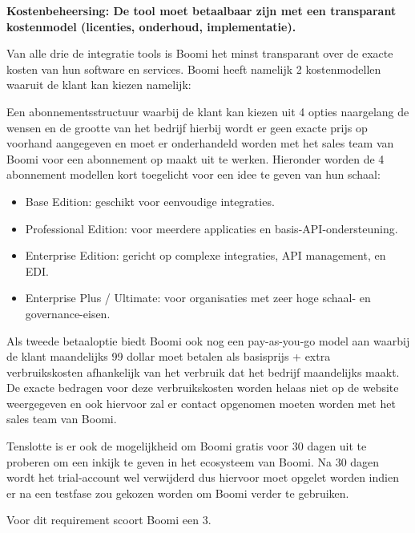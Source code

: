 \textbf{Kostenbeheersing: De tool moet betaalbaar zijn met een transparant kostenmodel (licenties, onderhoud, implementatie).}

\vspace{\baselineskip}

Van alle drie de integratie tools is Boomi het minst transparant over de exacte kosten van hun software en services. Boomi heeft namelijk 2 kostenmodellen waaruit de klant kan kiezen namelijk:

\vspace{\baselineskip}

Een abonnementsstructuur waarbij de klant kan kiezen uit 4 opties naargelang de wensen en de grootte van het bedrijf hierbij wordt er geen exacte prijs op voorhand aangegeven en moet er onderhandeld worden met het sales team van Boomi voor een abonnement op maakt uit te werken. Hieronder worden de 4 abonnement modellen kort toegelicht voor een idee te geven van hun schaal:

\begin{itemize}
    \item Base Edition: geschikt voor eenvoudige integraties.
    \item Professional Edition: voor meerdere applicaties en basis-API-ondersteuning.
    \item Enterprise Edition:  gericht op complexe integraties, API management, en EDI.
    \item Enterprise Plus / Ultimate:  voor organisaties met zeer hoge schaal- en governance-eisen.
\end{itemize}

Als tweede betaaloptie biedt Boomi ook nog een pay-as-you-go model aan waarbij de klant maandelijks 99 dollar moet betalen als basisprijs + extra verbruikskosten afhankelijk van het verbruik dat het bedrijf maandelijks maakt. De exacte bedragen voor deze verbruikskosten worden helaas niet op de website weergegeven en ook hiervoor zal er contact opgenomen moeten worden met het sales team van Boomi.

Tenslotte is er ook de mogelijkheid om Boomi gratis voor 30 dagen uit te proberen om een inkijk te geven in het ecosysteem van Boomi. Na 30 dagen wordt het trial-account wel verwijderd dus hiervoor moet opgelet worden indien er na een testfase zou gekozen worden om Boomi verder te gebruiken.

Voor dit requirement scoort Boomi een 3.

\vspace{\baselineskip}


